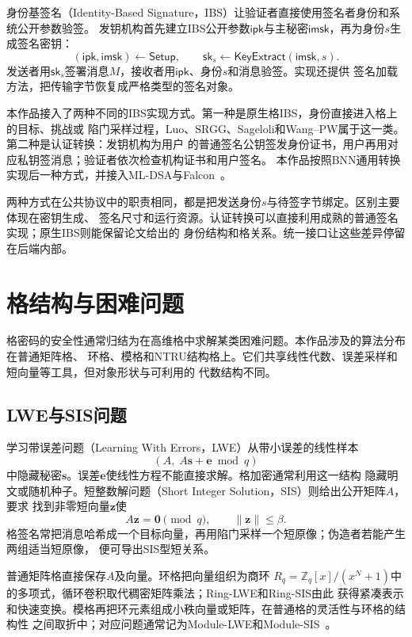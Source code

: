 身份基签名（Identity-Based Signature，IBS）让验证者直接使用签名者身份和系统公开参数验签。
发钥机构首先建立IBS公开参数$\mathsf{ipk}$与主秘密$\mathsf{imsk}$，再为身份$s$生成签名密钥：
\[
 (\mathsf{ipk},\mathsf{imsk})\leftarrow\mathsf{Setup},
 \qquad
 \mathsf{sk}_s\leftarrow\mathsf{KeyExtract}(\mathsf{imsk},s).
\]
发送者用$\mathsf{sk}_s$签署消息$M$，接收者用$\mathsf{ipk}$、身份$s$和消息验签。实现还提供
签名加载方法，把传输字节恢复成严格类型的签名对象。

本作品接入了两种不同的IBS实现方式。第一种是原生格IBS，身份直接进入格上的目标、挑战或
陷门采样过程，Luo、SRGG、Sageloli和Wang--PW属于这一类。第二种是认证转换：发钥机构为用户
的普通签名公钥签发身份证书，用户再用对应私钥签消息；验证者依次检查机构证书和用户签名。
本作品按照BNN通用转换实现后一种方式，并接入ML-DSA与Falcon~\cite{galindo2006ibs,nist2024fips204,falcon2020}。

两种方式在公共协议中的职责相同，都是把发送身份$s$与待签字节绑定。区别主要体现在密钥生成、
签名尺寸和运行资源。认证转换可以直接利用成熟的普通签名实现；原生IBS则能保留论文给出的
身份结构和格关系。统一接口让这些差异停留在后端内部。

\section{格结构与困难问题}

格密码的安全性通常归结为在高维格中求解某类困难问题。本作品涉及的算法分布在普通矩阵格、
环格、模格和NTRU结构格上。它们共享线性代数、误差采样和短向量等工具，但对象形状与可利用的
代数结构不同。

\subsection{LWE与SIS问题}

学习带误差问题（Learning With Errors，LWE）从带小误差的线性样本
\[
  (A,\;A\mathbf{s}+\mathbf{e}\bmod q)
\]
中隐藏秘密$\mathbf{s}$。误差$\mathbf{e}$使线性方程不能直接求解。格加密通常利用这一结构
隐藏明文或随机种子。短整数解问题（Short Integer Solution，SIS）则给出公开矩阵$A$，要求
找到非零短向量$\mathbf{z}$使
\[
  A\mathbf{z}=\mathbf{0}\pmod q,
  \qquad \lVert\mathbf{z}\rVert\leq\beta.
\]
格签名常把消息哈希成一个目标向量，再用陷门采样一个短原像；伪造者若能产生两组适当短原像，
便可导出SIS型短关系。

普通矩阵格直接保存$A$及向量。环格把向量组织为商环
$R_q=\mathbb Z_q[x]/(x^N+1)$中的多项式，循环卷积取代稠密矩阵乘法；Ring-LWE和Ring-SIS由此
获得紧凑表示和快速变换。模格再把环元素组成小秩向量或矩阵，在普通格的灵活性与环格的结构性
之间取折中；对应问题通常记为Module-LWE和Module-SIS~\cite{lpr2013ring,langlois2015module}。

